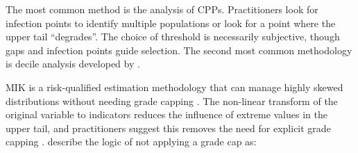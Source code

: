 The most common method is the analysis of \glspl{CPP}. Practitioners look for infection points to identify multiple populations or look for a point where the upper tail ``degrades''. The choice of threshold is necessarily subjective, though gaps and infection points guide selection. The second most common methodology is decile analysis developed by \cite{parrish1997geologist}.





\Gls{MIK} is a risk-qualified estimation methodology that can manage highly skewed distributions without needing grade capping \citep{journel1983nonparametric}. The non-linear transform of the original variable to indicators reduces the influence of extreme values in the upper tail, and practitioners suggest this removes the need for explicit grade capping \citep{pretium2020, ngm2020, tristar2021, cardinal2019}. \cite{pretium2020} describe the logic of not applying a grade cap as:


